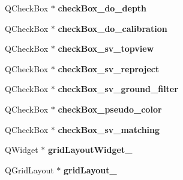 \begin{DoxyCompactItemize}
\item 
\hypertarget{class_ui___main_window_ae35071328d0668a7e62e047029368bed}{}Q\+Check\+Box $\ast$ {\bfseries check\+Box\+\_\+do\+\_\+depth}\label{class_ui___main_window_ae35071328d0668a7e62e047029368bed}

\item 
\hypertarget{class_ui___main_window_af670c1897b37e4093073974f3bbf7c09}{}Q\+Check\+Box $\ast$ {\bfseries check\+Box\+\_\+do\+\_\+calibration}\label{class_ui___main_window_af670c1897b37e4093073974f3bbf7c09}

\item 
\hypertarget{class_ui___main_window_a1fc06a178397ef63d25fe96349099ab8}{}Q\+Check\+Box $\ast$ {\bfseries check\+Box\+\_\+sv\+\_\+topview}\label{class_ui___main_window_a1fc06a178397ef63d25fe96349099ab8}

\item 
\hypertarget{class_ui___main_window_aedebdae38e5446839b1f1f2983f69a54}{}Q\+Check\+Box $\ast$ {\bfseries check\+Box\+\_\+sv\+\_\+reproject}\label{class_ui___main_window_aedebdae38e5446839b1f1f2983f69a54}

\item 
\hypertarget{class_ui___main_window_aab0c094f66a7f74c317e9eb2e7689911}{}Q\+Check\+Box $\ast$ {\bfseries check\+Box\+\_\+sv\+\_\+ground\+\_\+filter}\label{class_ui___main_window_aab0c094f66a7f74c317e9eb2e7689911}

\item 
\hypertarget{class_ui___main_window_ae5e48c20d3d248c796e55fcba3ea2ba2}{}Q\+Check\+Box $\ast$ {\bfseries check\+Box\+\_\+pseudo\+\_\+color}\label{class_ui___main_window_ae5e48c20d3d248c796e55fcba3ea2ba2}

\item 
\hypertarget{class_ui___main_window_ad24fd0169d0cc3ed51496d31e547a70b}{}Q\+Check\+Box $\ast$ {\bfseries check\+Box\+\_\+sv\+\_\+matching}\label{class_ui___main_window_ad24fd0169d0cc3ed51496d31e547a70b}

\item 
\hypertarget{class_ui___main_window_a5010b4398d1ab2848f0d321919cc35bb}{}Q\+Widget $\ast$ {\bfseries grid\+Layout\+Widget\+\_}\label{class_ui___main_window_a5010b4398d1ab2848f0d321919cc35bb}

\item 
\hypertarget{class_ui___main_window_a82eb42bdbffbbd70131d0f615609aa71}{}Q\+Grid\+Layout $\ast$ {\bfseries grid\+Layout\+\_}\label{class_ui___main_window_a82eb42bdbffbbd70131d0f615609aa71}


\end{DoxyCompactItemize}
